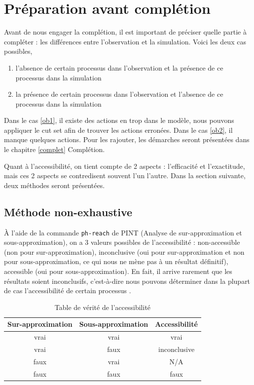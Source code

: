 \documentclass[11pt]{report}
\theoremstyle{definition}
\begin{document}
\chapter{Pr\'eparation avant compl\'etion}
Avant de nous engager la compl\'etion, il est important de pr\'eciser quelle partie \`a compl\'eter : les diff\'erences entre l'observation et la simulation. Voici les deux cas possibles,
\begin{enumerate}
\item l'absence de certain processus dans l'observation et la pr\'esence de ce processus dans la simulation\label{ob1}
\item la pr\'esence de certain processus dans l'observation et l'absence de ce processus dans la simulation\label{ob2}
\end{enumerate}
Dans le cas \ref{ob1}, il existe des actions en trop dans le mod\`ele, nous pouvons appliquer le cut set afin de trouver les actions erron\'ees. Dans le cas \ref{ob2}, il manque quelques actions. Pour les rajouter, les d\'emarches seront pr\'esent\'ees dans le chapitre \ref{complet} Compl\'etion. 

Quant \`a l'accessibilit\'e, on tient compte de 2 aspects : l'efficacit\'e et l'exactitude, mais ces 2 aspects se contredisent souvent l'un l'autre. Dans la section suivante, deux m\'ethodes seront pr\'esent\'ees.
\section{M\'ethode non-exhaustive}
\`A l'aide de la commande \texttt{ph-reach} de {\Large P}INT (Analyse de sur-approximation et sous-approximation), on a 3 valeurs possibles de l'accessibilit\'e : non-accessible (non pour sur-approximation), inconclusive (oui pour sur-approximation et non pour sous-approximation, ce qui nous ne m\`ene pas \`a un r\'esultat d\'efinitif), accessible (oui pour sous-approximation). En fait, il arrive rarement que les r\'esultats soient inconclusifs, c'est-\`a-dire nous pouvons d\'eterminer dans la plupart de cas l'accessibilit\'e de certain processus \citep{Pauleve2012}.
\begin{table}[ht]
\centering
\begin{tabular}{|c|c|c|}
\hline
Sur-approximation & Sous-approximation & Accessibilit\'e\\
\hline
vrai & vrai & vrai\\
\hline
vrai & faux & inconclusive\\
\hline
faux & vrai & N/A\\
\hline
faux & faux & faux\\
\hline
\end{tabular}
\caption{Table de v\'erit\'e de l'accessibilit\'e}\label{tab2}
\end{table}
\end{document}
